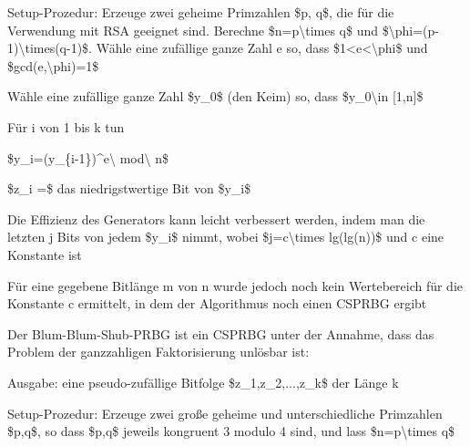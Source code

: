 \documentclass[a4paper]{article}
\begin{document}
\begin{multicols}{3}
\begin{itemize*}
            \begin{enumerate*}
                  \def\labelenumi{\arabic{enumi}.}
                  \item Setup-Prozedur: Erzeuge zwei geheime Primzahlen \$p, q\$, die für die Verwendung mit RSA geeignet sind. Berechne \$n=p\textbackslash times q\$ und \$\textbackslash phi=(p-1)\textbackslash times(q-1)\$. Wähle eine zufällige ganze Zahl e so, dass \$1\textless e\textless\textbackslash phi\$ und \$gcd(e,\textbackslash phi)=1\$
                  \item Wähle eine zufällige ganze Zahl \$y\_0\$ (den Keim) so, dass \$y\_0\textbackslash in {[}1,n{]}\$
                  \item Für i von 1 bis k tun
                  \begin{enumerate*} \def\labelenumii{\arabic{enumii}.} \item \$y\_i=(y\_\{i-1\})\^{}e\textbackslash{} mod\textbackslash{} n\$ \item \$z\_i =\$ das niedrigstwertige Bit von \$y\_i\$ \end{enumerate*}
            \end{enumerate*}
            \begin{itemize*}
                  \item Die Effizienz des Generators kann leicht verbessert werden, indem man die letzten j Bits von jedem \$y\_i\$ nimmt, wobei \$j=c\textbackslash times lg(lg(n))\$ und c eine Konstante ist
                  \item Für eine gegebene Bitlänge m von n wurde jedoch noch kein Wertebereich für die Konstante c ermittelt, in dem der Algorithmus noch einen CSPRBG ergibt
            \end{itemize*}
            \item Der Blum-Blum-Shub-PRBG ist ein CSPRBG unter der Annahme, dass das
            Problem der ganzzahligen Faktorisierung unlösbar ist:
            \begin{itemize*}
                  \item Ausgabe: eine pseudo-zufällige Bitfolge \$z\_1,z\_2,...,z\_k\$ der Länge k
            \end{itemize*}
            \begin{enumerate*}
                  \def\labelenumi{\arabic{enumi}.}
                  \item Setup-Prozedur: Erzeuge zwei große geheime und unterschiedliche Primzahlen \$p,q\$, so dass \$p,q\$ jeweils kongruent 3 modulo 4 sind, und lass \$n=p\textbackslash times q\$

\end{enumerate*}
\end{itemize*}
\end{multicols}
\end{document}
